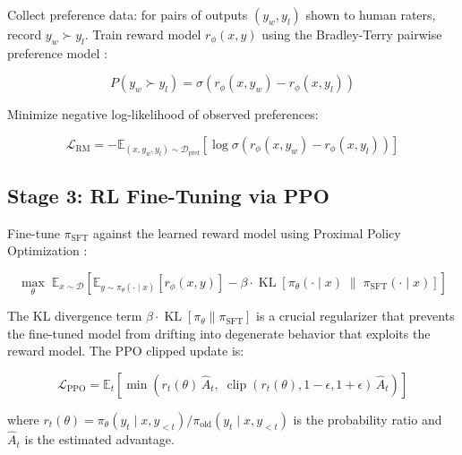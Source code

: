 Collect preference data: for pairs of outputs $(y_w, y_l)$ shown to human raters, record $y_w \succ y_l$. Train reward model $r_\phi(x,y)$ using the Bradley-Terry pairwise preference model \autocite{christiano2017deep}:

\begin{equation}
P(y_w \succ y_l) = \sigma\!\left(r_\phi(x, y_w) - r_\phi(x, y_l)\right)
\label{eq:bradley-terry}
\end{equation}

Minimize negative log-likelihood of observed preferences:

\begin{equation}
\mathcal{L}_{\text{RM}} = -\mathbb{E}_{(x, y_w, y_l) \sim \mathcal{D}_{\text{pref}}} \left[\log \sigma\!\left(r_\phi(x, y_w) - r_\phi(x, y_l)\right)\right]
\label{eq:rm-loss}
\end{equation}

\subsection{Stage 3: RL Fine-Tuning via PPO}

Fine-tune $\pi_{\text{SFT}}$ against the learned reward model using Proximal Policy Optimization \autocite{ouyang2022training}:

\begin{equation}
\max_\theta \;\mathbb{E}_{x \sim \mathcal{D}} \!\left[\mathbb{E}_{y \sim \pi_\theta(\cdot \mid x)} \!\left[r_\phi(x, y)\right] - \beta \cdot \operatorname{KL}\!\left[\pi_\theta(\cdot \mid x) \;\|\; \pi_{\text{SFT}}(\cdot \mid x)\right]\right]
\label{eq:rlhf-objective}
\end{equation}

The KL divergence term $\beta \cdot \operatorname{KL}[\pi_\theta \| \pi_{\text{SFT}}]$ is a crucial regularizer that prevents the fine-tuned model from drifting into degenerate behavior that exploits the reward model. The PPO clipped update is:

\begin{equation}
\mathcal{L}_{\text{PPO}} = \mathbb{E}_t\!\left[\min\!\left(r_t(\theta)\,\hat{A}_t,\;\operatorname{clip}(r_t(\theta), 1{-}\epsilon, 1{+}\epsilon)\,\hat{A}_t\right)\right]
\label{eq:ppo}
\end{equation}

where $r_t(\theta) = \pi_\theta(y_t \mid x, y_{<t}) / \pi_{\text{old}}(y_t \mid x, y_{<t})$ is the probability ratio and $\hat{A}_t$ is the estimated advantage.

